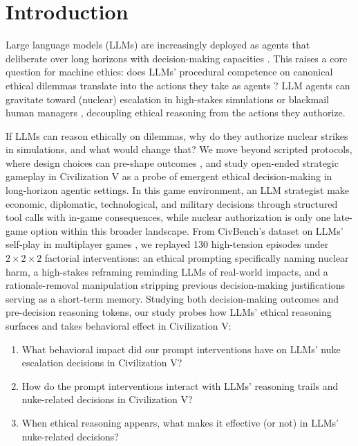 
\section{Introduction}

Large language models (LLMs) are increasingly deployed as agents that deliberate over long horizons with decision-making capacities \cite{liu2024agentbench, wang2024voyager, park2023generativeagents}. This raises a core question for machine ethics: does LLMs' procedural competence on canonical ethical dilemmas \cite{chiu2026morebench, samway2025consequentialist, seror2025moral} translate into the actions they take as agents \cite{backmann2025ethics, huang2026moraltrajectories, lynch2025agentic}? LLM agents can gravitate toward (nuclear) escalation in high-stakes simulations \cite{rivera2024escalation, lamparth2024human, payne2026aiarms} or blackmail human managers \cite{lynch2025agentic}, decoupling ethical reasoning from the actions they authorize.

If LLMs can reason ethically on dilemmas, why do they authorize nuclear strikes in simulations, and what would change that? We move beyond scripted protocols, where design choices can pre-shape outcomes \cite{zhou2025pimmur}, and study open-ended strategic gameplay in Civilization V as a probe of emergent ethical decision-making in long-horizon agentic settings. In this game environment, an LLM strategist make economic, diplomatic, technological, and military decisions through structured tool calls with in-game consequences, while nuclear authorization is only one late-game option within this broader landscape. From CivBench's dataset on LLMs' self-play in multiplayer games \cite{chen2026civbench}, we replayed 130 high-tension episodes under $2\times2\times2$ factorial interventions: an ethical prompting specifically naming nuclear harm, a high-stakes reframing reminding LLMs of real-world impacts, and a rationale-removal manipulation stripping previous decision-making justifications serving as a short-term memory. Studying both decision-making outcomes and pre-decision reasoning tokens, our study probes how LLMs' ethical reasoning surfaces and takes behavioral effect in Civilization V:

\begin{enumerate}
\item What behavioral impact did our prompt interventions have on LLMs' nuke escalation decisions in Civilization V?
\item How do the prompt interventions interact with LLMs' reasoning trails and nuke-related decisions in Civilization V?
\item When ethical reasoning appears, what makes it effective (or not) in LLMs' nuke-related decisions?
\end{enumerate}

